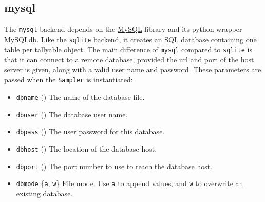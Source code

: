 
\hypertarget{mysql}{}
\subsection*{mysql}

The \texttt{mysql} backend depends on the \href{http://www.mysql.com/downloads/}{MySQL} library and its python wrapper
\href{http://sourceforge.net/projects/mysql-python}{MySQLdb}. Like the \texttt{sqlite} backend, it creates an SQL database containing
one table per tallyable object. The main difference of \texttt{mysql} compared to 
\texttt{sqlite} is that it can connect to a remote database, provided the url and 
port of the host server is given, along with a valid user name and password. 
These parameters are passed when the \texttt{Sampler} is instantiated:
\begin{itemize}
\item {} 
\texttt{dbname} () The name of the database file.

\item {} 
\texttt{dbuser} () The database user name.

\item {} 
\texttt{dbpass} () The user password for this database.

\item {} 
\texttt{dbhost} () The location of the database host.

\item {} 
\texttt{dbport} ()    The port number to use to reach the database host.

\item {} 
\texttt{dbmode} {\{}\texttt{a}, \texttt{w}{\}} File mode.  Use \texttt{a} to append values, and \texttt{w} 
to overwrite an existing database.

\end{itemize}
\begin{center}\begin{sffamily}
\end{sffamily}
\end{center}


